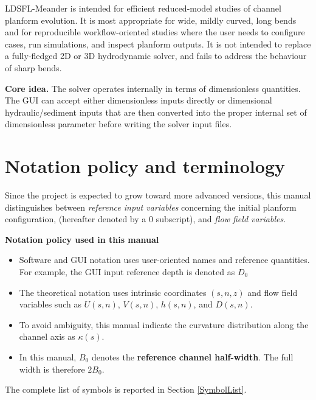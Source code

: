 \documentclass[11pt,a4paper]{article}
\begin{document}
 \noindent  LDSFL-Meander is intended for efficient reduced-model studies of channel planform evolution. It is most appropriate for wide, mildly curved, long bends and for reproducible workflow-oriented studies where the user needs to configure cases, run simulations, and inspect planform outputs. It is not intended to replace a fully-fledged 2D or 3D hydrodynamic solver, and fails to address the behaviour of sharp bends.

\begin{infobox}
\textbf{Core idea.} The solver operates internally in terms of dimensionless quantities. The GUI can accept either dimensionless inputs directly or dimensional hydraulic/sediment inputs that are then converted into the proper internal set of dimensionless parameter before writing the solver input files.
\end{infobox}

\section{Notation policy and terminology}
\label{Notations}

Since the project is expected to grow toward more advanced versions, this manual distinguishes between \emph{reference input variables } concerning the initial planform configuration,  (hereafter denoted by a $0$ subscript), and \emph{flow field variables}.

\begin{infobox}
	\textbf{Notation policy used in this manual}
	\begin{itemize}[leftmargin=1.2em]
		\item Software and GUI notation uses user-oriented names and reference quantities. For example, the GUI input reference depth is denoted as $D_0$
		\item The theoretical notation uses intrinsic coordinates $(s,n,z)$ and flow field variables such as $U(s,n)$, $V(s,n)$, $h(s,n)$, and $D(s,n)$.
		\item To avoid ambiguity, this manual indicate the curvature distribution along the channel axis as $\kappa(s)$.
		\item In this manual, $B_0$ denotes the \textbf{reference channel half-width}. The full width is therefore $2B_0$.
	\end{itemize}
\end{infobox}

The complete list of symbols is reported in Section  \ref{SymbolList}.
\end{document}
